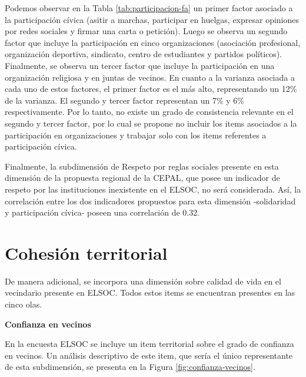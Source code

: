 \documentclass[
  12pt,
]{book}
\begin{document}
Podemos observar en la Tabla \ref{tab:participacion-fa} un primer factor asociado a la participación cívica (asitir a marchas, participar en huelgas, expresar opiniones por redes sociales y firmar una carta o petición). Luego se observa un segundo factor que incluye la participación en cinco organizaciones (asociación profesional, organización deportiva, sindicato, centro de estudiantes y partidos políticos). Finalmente, se observa un tercer factor que incluye la participación en una organización religiosa y en juntas de vecinos. En cuanto a la varianza asociada a cada uno de estos factores, el primer factor es el más alto, representando un 12\% de la varianza. El segundo y tercer factor representan un 7\% y 6\% respectivamente. Por lo tanto, no existe un grado de consistencia relevante en el segundo y tercer factor, por lo cual se propone no incluir los items asociados a la participación en organizaciones y trabajar solo con los items referentes a participación cívica.

Finalmente, la subdimensión de Respeto por reglas sociales presente en esta dimensión de la propuesta regional de la CEPAL, que posee un indicador de respeto por las instituciones inexistente en el ELSOC, no será considerada. Así, la correlación entre los dos indicadores propuestos para esta dimensión -solidaridad y participación cívica- poseen una correlación de 0.32.

\hypertarget{cohesiuxf3n-territorial}{%
\section{Cohesión territorial}\label{cohesiuxf3n-territorial}}

De manera adicional, se incorpora una dimensión sobre calidad de vida en el vecindario presente en ELSOC. Todos estos items se encuentran presentes en las cinco olas.

\textbf{Confianza en vecinos}

En la encuesta ELSOC se incluye un item territorial sobre el grado de confianza en vecinos. Un análisis descriptivo de este item, que sería el único representante de esta subdimensión, se presenta en la Figura \ref{fig:confianza-vecinos}.
\end{document}
